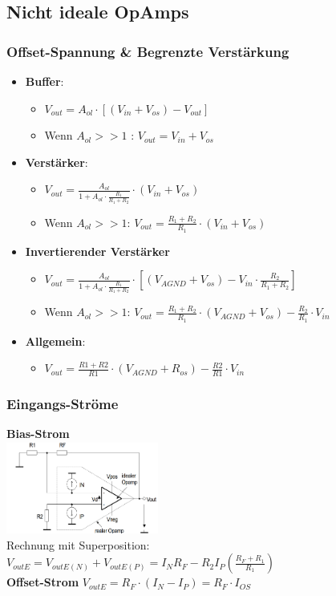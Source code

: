 \documentclass[margin=normal]{tex/hsrzf}
\begin{document}
\subsection{Nicht ideale OpAmps}
\begin{multicols*}{2}

  \subsubsection*{Offset-Spannung \& Begrenzte Verstärkung}
  \begin{itemize}
    \item \textbf{Buffer}:
          \begin{itemize}
            \item $V_{out} = A_{ol} \cdot [(V_{in}+V_{os}) - V_{out}]$
            \item Wenn $A_{ol}>>1$ : $V_{out} = V_{in} + V_{os}$
          \end{itemize}
    \item \textbf{Verstärker}:
          \begin{itemize}
            \item $V_{out} = \frac{A_{ol}}{1+A_{ol}\cdot\frac{R_1}{R_1+R_2}}\cdot(V_{in}+V_{os}) $
            \item Wenn $A_{ol}>>1$: $V_{out} = \frac{R_1+R_2}{R_1}\cdot(V_{in}+V_{os})$
          \end{itemize}
    \item \textbf{Invertierender Verstärker}
          \begin{itemize}
            \item $V_{out} = \frac{A_{ol}}{1+A_{ol}\cdot\frac{R_1}{R_1+R_2}}\cdot[(V_{AGND} + V_{os})-V_{in}\cdot\frac{R_2}{R_1+R_2}]$
            \item Wenn $A_{ol}>>1$: $V_{out} = \frac{R_1 + R_2}{R_1}\cdot(V_{AGND}+V_{os})-\frac{R_2}{R_1}\cdot V_{in} $
          \end{itemize}
    \item \textbf{Allgemein}:
          \begin{itemize}
            \item $V_{out} = \frac{R1 + R2}{R1}\cdot(V_{AGND}+R_{os})-\frac{R2}{R1}\cdot V_{in}$
          \end{itemize}
  \end{itemize}
  \subsubsection*{Eingangs-Ströme}
  \textbf{Bias-Strom}\\
  \includegraphics[width=5cm]{img/OpAmp/Fehler_Eingangsstrom.png}\\
  Rechnung mit Superposition:\\
  $V_{out E} = V_{outE(N)} + V_{outE(P)} = I_NR_F-R_2I_P(\frac{R_F+R_1}{R_1}) $\\
  \textbf{Offset-Strom}
  $V_{out E} = R_F\cdot(I_N-I_P) = R_F\cdot I_{OS}$

\end{multicols*}
\end{document}

